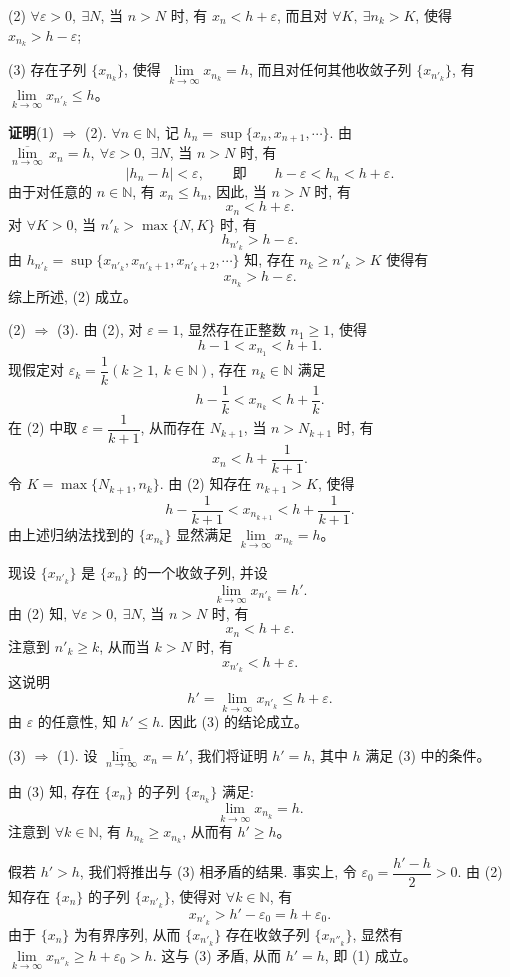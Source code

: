 \documentclass[UTF8,12pt,a4paper,fontset=fandol]{ctexart}
\begin{document}
(2) $\forall\varepsilon>0,\ \exists N$, 当 $n>N$ 时, 有 $x_n<h+\varepsilon$, 而且对 $\forall K,\ \exists n_k>K$, 使得 $x_{n_k}>h-\varepsilon$;

(3) 存在子列 $\{x_{n_k}\}$, 使得 $\lim\limits_{k\to\infty}x_{n_k}=h$, 而且对任何其他收敛子列 $\{x_{n'_k}\}$, 有 $\lim\limits_{k\to\infty}x_{n'_k}\leqslant h$。

\noindent\textbf{证明}\quad (1) $\Rightarrow$ (2). $\forall n\in\mathbb{N}$, 记 $h_n=\sup\{x_n,x_{n+1},\cdots\}$. 由 $\overline{\lim\limits_{n\to\infty}}\,x_n=h,\ \forall\varepsilon>0,\ \exists N$, 当 $n>N$ 时, 有
\[
  |h_n-h|<\varepsilon,
  \qquad\text{即}\qquad h-\varepsilon<h_n<h+\varepsilon.
\]
由于对任意的 $n\in\mathbb{N}$, 有 $x_n\leqslant h_n$, 因此, 当 $n>N$ 时, 有
\[
  x_n<h+\varepsilon.
\]
对 $\forall K>0$, 当 $n'_k>\max\{N,K\}$ 时, 有
\[
  h_{n'_k}>h-\varepsilon.
\]
由 $h_{n'_k}=\sup\{x_{n'_k},x_{n'_k+1},x_{n'_k+2},\cdots\}$ 知, 存在 $n_k\geqslant n'_k>K$ 使得有
\[
  x_{n_k}>h-\varepsilon.
\]
综上所述, (2) 成立。

(2) $\Rightarrow$ (3). 由 (2), 对 $\varepsilon=1$, 显然存在正整数 $n_1\geqslant1$, 使得
\[
  h-1<x_{n_1}<h+1.
\]
现假定对 $\varepsilon_k=\dfrac1k(k\geqslant1,\ k\in\mathbb{N})$, 存在 $n_k\in\mathbb{N}$ 满足
\[
  h-\frac1k<x_{n_k}<h+\frac1k.
\]
在 (2) 中取 $\varepsilon=\dfrac1{k+1}$, 从而存在 $N_{k+1}$, 当 $n>N_{k+1}$ 时, 有
\[
  x_n<h+\frac1{k+1}.
\]
令 $K=\max\{N_{k+1},n_k\}$. 由 (2) 知存在 $n_{k+1}>K$, 使得
\[
  h-\frac1{k+1}<x_{n_{k+1}}<h+\frac1{k+1}.
\]
由上述归纳法找到的 $\{x_{n_k}\}$ 显然满足 $\lim\limits_{k\to\infty}x_{n_k}=h$。

现设 $\{x_{n'_k}\}$ 是 $\{x_n\}$ 的一个收敛子列, 并设
\[
  \lim_{k\to\infty}x_{n'_k}=h'.
\]
由 (2) 知, $\forall\varepsilon>0,\ \exists N$, 当 $n>N$ 时, 有
\[
  x_n<h+\varepsilon.
\]
注意到 $n'_k\geqslant k$, 从而当 $k>N$ 时, 有
\[
  x_{n'_k}<h+\varepsilon.
\]
这说明
\[
  h'=\lim_{k\to\infty}x_{n'_k}\leqslant h+\varepsilon.
\]
由 $\varepsilon$ 的任意性, 知 $h'\leqslant h$. 因此 (3) 的结论成立。

(3) $\Rightarrow$ (1). 设 $\overline{\lim\limits_{n\to\infty}}\,x_n=h'$, 我们将证明 $h'=h$, 其中 $h$ 满足 (3) 中的条件。

由 (3) 知, 存在 $\{x_n\}$ 的子列 $\{x_{n_k}\}$ 满足:
\[
  \lim_{k\to\infty}x_{n_k}=h.
\]
注意到 $\forall k\in\mathbb{N}$, 有 $h_{n_k}\geqslant x_{n_k}$, 从而有 $h'\geqslant h$。

假若 $h'>h$, 我们将推出与 (3) 相矛盾的结果. 事实上, 令 $\varepsilon_0=\dfrac{h'-h}{2}>0$. 由 (2) 知存在 $\{x_n\}$ 的子列 $\{x_{n'_k}\}$, 使得对 $\forall k\in\mathbb{N}$, 有
\[
  x_{n'_k}>h'-\varepsilon_0=h+\varepsilon_0.
\]
由于 $\{x_n\}$ 为有界序列, 从而 $\{x_{n'_k}\}$ 存在收敛子列 $\{x_{n''_k}\}$, 显然有 $\lim\limits_{k\to\infty}x_{n''_k}\geqslant h+\varepsilon_0>h$. 这与 (3) 矛盾, 从而 $h'=h$, 即 (1) 成立。
\end{document}
